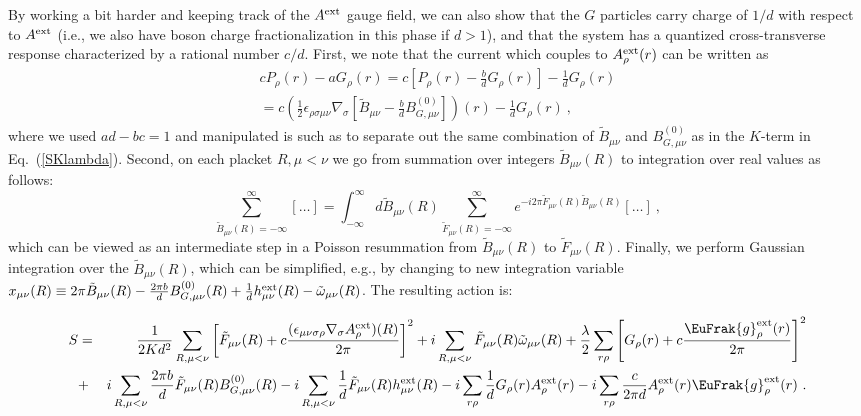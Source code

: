 \documentclass[prb,twocolumn]{revtex4-1}
\def\cP{{P}}
\def\cG{{G}}
\def\Aext{A^{\rm ext}}
\def\hext{h^{\rm ext}}
\def\uu{B}
\begin{document}
By working a bit harder and keeping track of the $\Aext$ gauge field, we can also show that the $\cG$ particles carry charge of $1/d$ with respect to $\Aext$ (i.e., we also have boson charge fractionalization in this phase if $d > 1$), and that the system has a quantized cross-transverse response characterized by a rational number $c/d$.
First, we note that the current which couples to $\Aext_\rho(r)$ can be written as
\begin{eqnarray*}
c \cP_\rho(r) - a \cG_\rho(r) = c \left[\cP_\rho(r) - \frac{b}{d} \cG_\rho(r) \right] - \frac{1}{d} \cG_\rho(r) \\
= c \left(\frac{1}{2} \epsilon_{\rho\sigma\mu\nu} \nabla_\sigma \left[\tilde{\uu}_{\mu\nu} - \frac{b}{d} \uu_{G, \mu\nu}^{(0)} \right]\right)(r) - \frac{1}{d} \cG_\rho(r) ~,
\end{eqnarray*}
where we used $ad - bc = 1$ and manipulated is such as to separate out the same combination of $\tilde{\uu}_{\mu\nu}$ and $\uu_{G, \mu\nu}^{(0)}$ as in the $K$-term in Eq.~(\ref{SKlambda}).
Second, on each placket $R, \mu < \nu$ we go from summation over integers $\tilde{\uu}_{\mu\nu}(R)$ to integration over real values as follows:
\begin{equation*}
\sum_{\tilde{\uu}_{\mu\nu}(R) = -\infty}^\infty \!\!\!\!\! [\dots ]
\!=\! \int_{-\infty}^\infty \!\!\!\! d\tilde{\uu}_{\mu\nu}(R) \!\!\!\!\! \sum_{\tilde{F}_{\mu\nu}(R) = -\infty}^\infty \!\!\!\!\! e^{-i 2\pi \tilde{F}_{\mu\nu}(R) \tilde{\uu}_{\mu\nu}(R)} [\dots ] ~,
\end{equation*}
which can be viewed as an intermediate step in a Poisson resummation from $\tilde{B}_{\mu\nu}(R)$ to $\tilde{F}_{\mu\nu}(R)$. 
Finally, we perform Gaussian integration over the $\tilde{\uu}_{\mu\nu}(R)$, which can be simplified, e.g., by changing to new integration variable $x_{\mu\nu}(R) \equiv 2\pi \tilde{\uu}_{\mu\nu}(R) - \frac{2\pi b}{d} \uu_{G, \mu\nu}^{(0)}(R) + \frac{1}{d} \hext_{\mu\nu}(R) - \tilde{\omega}_{\mu\nu}(R)$.
The resulting action is:
\begin{widetext}
\begin{eqnarray}
S &=& \frac{1}{2 K d^2} \sum_{R, \mu < \nu} \left[\tilde{F}_{\mu\nu}(R) + c \frac{(\epsilon_{\mu\nu\sigma\rho} \nabla_\sigma \Aext_\rho)(R)}{2\pi} \right]^2
+ i \sum_{R, \mu < \nu} \tilde{F}_{\mu\nu}(R) \tilde{\omega}_{\mu\nu}(R)
+ \frac{\lambda}{2} \sum_{r\rho} \left[\cG_\rho(r) + c \frac{\EuFrak{g}^{\rm ext}_\rho(r)}{2\pi} \right]^2 
\label{S_FG_wtildea} \\
&+& i \sum_{R, \mu < \nu} \frac{2\pi b}{d} \tilde{F}_{\mu\nu}(R) \uu_{G, \mu\nu}^{(0)}(R)
- i \sum_{R, \mu < \nu} \frac{1}{d} \tilde{F}_{\mu\nu}(R) \hext_{\mu\nu}(R)
- i \sum_{r\rho} \frac{1}{d} \cG_\rho(r) \Aext_\rho(r)
- i \sum_{r\rho} \frac{c}{2\pi d} \Aext_\rho(r) \EuFrak{g}^{\rm ext}_\rho(r) ~.\nonumber
\end{eqnarray}
\end{widetext}
\end{document}
